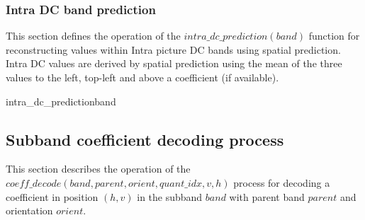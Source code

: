 \subsubsection{Intra DC band prediction}
\label{intradcprediction}

This section defines the operation of the $intra\_dc\_prediction(band)$ function
for reconstructing values within Intra picture DC bands using spatial prediction.
Intra DC values are derived by spatial prediction using the mean of the
three values to the left, top-left and above a coefficient (if available).

\begin{comment}
\begin{pseudo}{intra\_dc\_prediction}{band}
\bsFOR{v=0}{\height(band)-1}
  \bsFOR{h=0}{\width(band)-1}
    \bsCODE{prediction = 0 }
    \bsCODE{N = 0 }
    \bsIF{v>0}
      \bsCODE{prediction += band[v-1][h]}
      \bsCODE{N+=1}
      \bsIF{h>0}
        \bsCODE{prediction += band[v-1][h-1]+band[v][h-1]}
        \bsCODE{N+=1}
      \bsEND
    \bsELSE
      \bsIF{h>0}
        \bsCODE{prediction += band[0][h-1]}
        \bsCODE{N+=1}
      \bsEND
    \bsEND
    \bsCODE{prediction = prediction//N}
    \bsCODE{band[v][h] += prediction}
  \bsEND
\bsEND
\end{pseudo}
\end{comment}

\begin{pseudo}{intra\_dc\_prediction}{band}
        \bsELSE
        \bsEND
    \bsELSE
        \bsELSE
        \bsEND
    \bsEND
  \bsEND
\bsEND
\end{pseudo}
\subsection{Subband coefficient decoding process}

\label{wltcoeff}

This section describes the operation of the 
$coeff\_decode(band,parent,orient,quant\_idx,v,h)$ process
for decoding a coefficient in position $(h,v)$ in the subband $band$ with
parent band $parent$ and orientation $orient$.

